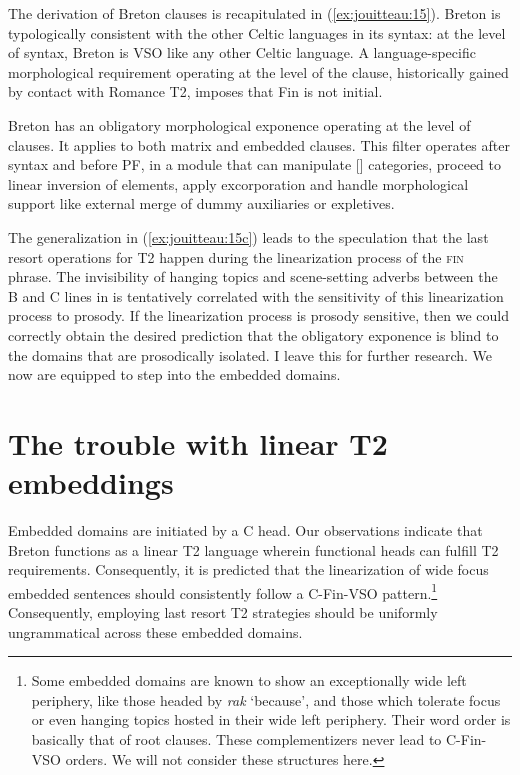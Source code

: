 \documentclass[output=paper,colorlinks,citecolor=brown]{langscibook}
\begin{document}
The derivation of Breton clauses is recapitulated in (\ref{ex:jouitteau:15}). Breton is typologically consistent with the other Celtic languages in its syntax: at the level of syntax, Breton is VSO like any other Celtic language. A language-specific morphological requirement operating at the level of the clause, historically gained by contact with Romance T2, imposes that Fin is not initial. 

\ea
    \label{ex:jouitteau:15}
    \ea \label{ex:jouitteau:15a} Breton has an obligatory morphological exponence operating at the level of clauses.
    \ex \label{ex:jouitteau:15b} It applies to both matrix and embedded clauses. 
    \ex \label{ex:jouitteau:15c} This filter operates after syntax and before PF, in a module that can manipulate [] categories, proceed to linear inversion of elements, apply excorporation and handle morphological support like external merge of dummy auxiliaries or expletives. 
    \z
    \z
    
\noindent The generalization in (\ref{ex:jouitteau:15c}) leads to the speculation that the last resort operations for T2 happen during the linearization process of the \textsc{fin} phrase. The invisibility of hanging topics and scene-setting adverbs between the B and C lines in  is tentatively correlated with the sensitivity of this linearization process to prosody. If the linearization process is prosody sensitive, then we could correctly obtain the desired prediction that the obligatory exponence is blind to the domains that are prosodically isolated. I leave this for further research. We now are equipped to step into the embedded domains.

\section{The trouble with linear T2 embeddings}\label{sec:jouitteau:3}

Embedded domains are initiated by a C head. Our observations indicate that Breton functions as a linear T2 language wherein functional heads can fulfill T2 requirements. Consequently, it is predicted that the linearization of wide focus embedded sentences should consistently follow a C-Fin-VSO pattern.\footnote{Some embedded domains are known to show an exceptionally wide left periphery, like those headed by \textit{rak} ‘because’, and those which tolerate focus or even hanging topics hosted in their wide left periphery. Their word order is basically that of root clauses. These complementizers never lead to C-Fin-VSO orders. We will not consider these structures here.}  Consequently, employing last resort T2 strategies should be uniformly ungrammatical across these embedded domains. 
\end{document}
